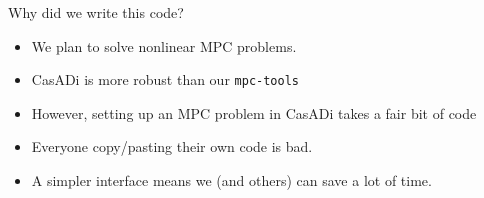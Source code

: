\documentclass[xcolor=dvipsnames]{beamer}
\begin{document}
%
%
%
%


\begin{frame}{Why did we write this code?}

\begin{itemize}
    \item We plan to solve nonlinear MPC problems.
    \item CasADi is more robust than our \texttt{mpc-tools}
    \item However, setting up an MPC problem in CasADi takes a fair bit of code
    \item Everyone copy/pasting their own code is bad.
    \item A simpler interface means we (and others) can save a lot of time.
\end{itemize}

\end{frame}
\end{document}
